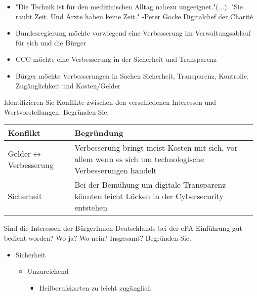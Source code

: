 \documentclass[a4paper]{assignment}
\begin{document}
\begin{problemlist}
\begin{enumerate}
\end{enumerate}


\begin{answer}
\begin{itemize}
\item "Die Technik ist für den medizinischen Alltag nahezu ungeeignet."(...). "Sie raubt Zeit. Und Ärzte haben keine Zeit." -Peter Gocke Digitalchef der Charité
\item Bundesregierung möchte vorwiegend eine Verbesserung im Verwaltungsablauf für sich und die Bürger
\item CCC möchte eine Verbesserung in der Sicherheit und Transparenz
\item Bürger möchte Verbesserungen in Sachen Sicherheit, Transparenz, Kontrolle, Zugänglichkeit und Kosten/Gelder
\end{itemize}
\end{answer}




\pbitem Identifizieren Sie Konflikte zwischen den verschiedenen Interessen und Wertvorstellungen. Begründen Sie.

\begin{center}
\begin{tabular}{| m{3.5cm} | m{10cm} |}
\hline
Konflikt & Begründung \\
\hline
Gelder$\leftrightarrow$Verbesserung & Verbesserung bringt meist Kosten mit sich, vor allem wenn es sich um technologische Verbesserungen handelt \\
\hline
Sicherheit & Bei der Bemühung um digitale Transparenz könnten leicht Lücken in der Cybersecurity entstehen \\
\hline
\end{tabular}
\end{center}

\pbitem Sind die Interessen der BürgerInnen Deutschlands bei der ePA-Einführung gut bedient worden? Wo ja? Wo nein? Insgesamt? Begründen Sie.

\begin{itemize}
	\item Sicherheit
	\begin{itemize}
		\item Unzureichend
		\begin{itemize}
			\item Heilberufskarten zu leicht zugänglich
		\end{itemize}
	\end{itemize}		
	

\end{itemize}
\end{problemlist}
\end{document}
